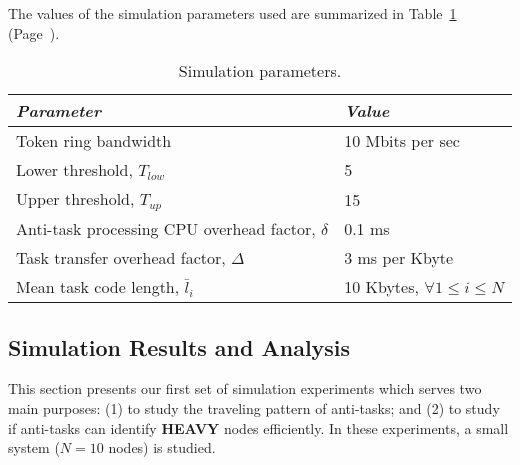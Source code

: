 The values of the simulation parameters used 
are summarized in 
Table~\ref{tab:anti.basic.parameter} 
(Page~\pageref{tab:anti.basic.parameter}).


\begin{table}[htbp]
\caption{Simulation parameters.}
\label{tab:anti.basic.parameter}

\begin{center}
\begin{tabular}{ll} \hline
{\sl Parameter} & {\sl Value} \\ \hline \hline
%
Token ring bandwidth				& 10 Mbits per sec \\
Lower threshold, $T_{low}$ 			& 5 \\
Upper threshold, $T_{up}$ 			& 15 \\
Anti-task processing CPU overhead factor, $\delta$  	& 0.1 ms \\
Task transfer overhead factor, $\Delta$		& 3 ms per Kbyte \\
Mean task code length, $\bar{l}_i$		
				& 10 Kbytes,  $\forall 1 \leq i \leq N$  \\ \hline
%
\end{tabular}
\end{center}

\end{table}




\subsection {Simulation Results and Analysis}
\label{sec:anti.basic.result_I}

This section presents our first set of simulation experiments
which serves two main purposes:
(1) to study the traveling pattern of anti-tasks; and
(2) to study if anti-tasks can identify {\bf HEAVY} nodes
efficiently. In these experiments, a small system ($N=10$ nodes)
is studied.

